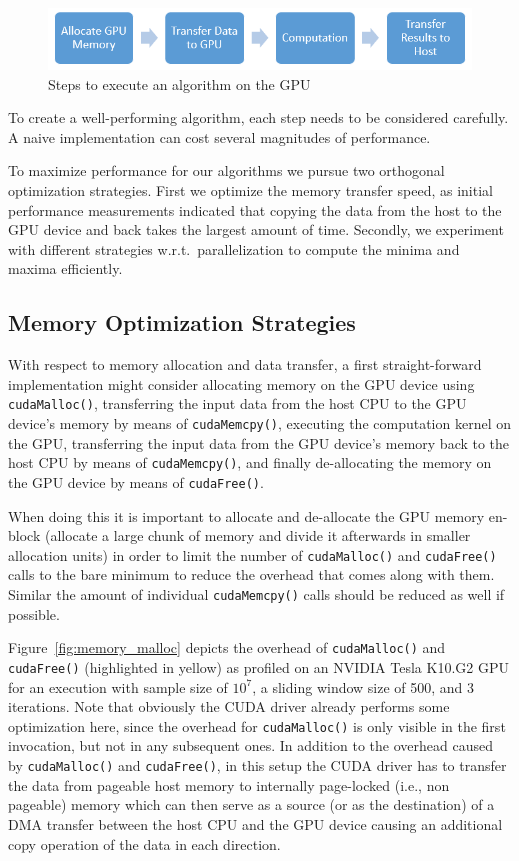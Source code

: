 \begin{figure} [h]
    \centering
    \includegraphics[width=0.8\linewidth]{Figures/steps}
    \caption{Steps to execute an algorithm on the GPU\label{fig:steps}}
\end{figure}

To create a well-performing algorithm, each step needs to be considered carefully. A naive implementation can cost several magnitudes of performance.

To maximize performance for our algorithms we pursue two orthogonal optimization strategies. First we optimize the memory transfer speed, as initial performance measurements indicated that copying the data from the host to the GPU device and back takes the largest amount of time. Secondly, we experiment with different strategies w.r.t.\ parallelization to compute the minima and maxima efficiently. 

\subsection{Memory Optimization Strategies}
\label{ch:memory optimization}

With respect to memory allocation and data transfer, a first straight-forward implementation might consider allocating memory on the GPU device using \texttt{cudaMalloc()}, transferring the input data from the host CPU to the GPU device's memory by means of \texttt{cudaMemcpy()}, executing the computation kernel on the GPU, transferring the input data from the GPU device's memory back to the host CPU by means of \texttt{cudaMemcpy()}, and finally de-allocating the memory on the GPU device by means of \texttt{cudaFree()}.

When doing this it is important to allocate and de-allocate the GPU memory en-block (allocate a large chunk of memory and divide it afterwards in smaller allocation units) in order to limit the number of \texttt{cudaMalloc()} and \texttt{cudaFree()} calls to the bare minimum to reduce the overhead that comes along with them. Similar the amount of individual \texttt{cudaMemcpy()} calls should be reduced as well if possible.

Figure~\ref{fig:memory_malloc} depicts the overhead of \texttt{cudaMalloc()} and \texttt{cudaFree()} (highlighted in yellow) as profiled on an NVIDIA Tesla K10.G2 GPU for an execution with sample size of $10^7$, a sliding window size of 500, and 3 iterations. Note that obviously the CUDA driver already performs some optimization here, since the overhead for \texttt{cudaMalloc()} is only visible in the first invocation, but not in any subsequent ones. In addition to the overhead caused by \texttt{cudaMalloc()} and \texttt{cudaFree()}, in this setup the CUDA driver has to transfer the data from pageable host memory to internally page-locked (i.e., non pageable) memory which can then serve as a source (or as the destination) of a DMA transfer between the host CPU and the GPU device causing an additional copy operation of the data in each direction.

